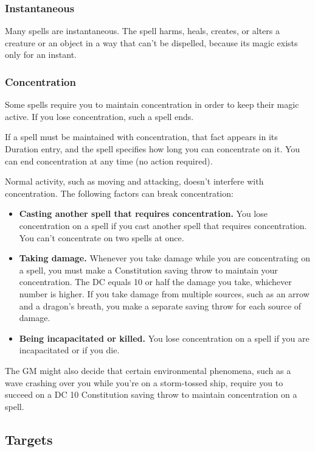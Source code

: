 \subsubsection{Instantaneous}

Many spells are instantaneous. The spell harms, heals, creates, or alters a creature or an object in a way that can't be dispelled, because its magic exists only for an instant.

\subsubsection{Concentration}

Some spells require you to maintain concentration in order to keep their magic active. If you lose concentration, such a spell ends.

If a spell must be maintained with concentration, that fact appears in its Duration entry, and the spell specifies how long you can concentrate on it. You can end concentration at any time (no action required).

Normal activity, such as moving and attacking, doesn't interfere with concentration. The following factors can break concentration:

\begin{itemize}
    \item \textbf{Casting another spell that requires concentration.} You lose concentration on a spell if you cast another spell that requires concentration. You can't concentrate on two spells at once.
    \item \textbf{Taking damage.} Whenever you take damage while you are concentrating on a spell, you must make a Constitution saving throw to maintain your concentration. The DC equals 10 or half the damage you take, whichever number is higher. If you take damage from multiple sources, such as an arrow and a dragon's breath, you make a separate saving throw for each source of damage.
    \item \textbf{Being incapacitated or killed.} You lose concentration on a spell if you are incapacitated or if you die.
\end{itemize}

The GM might also decide that certain environmental phenomena, such as a wave crashing over you while you're on a storm-tossed ship, require you to succeed on a DC 10 Constitution saving throw to maintain concentration on a spell.

\subsection{Targets}

